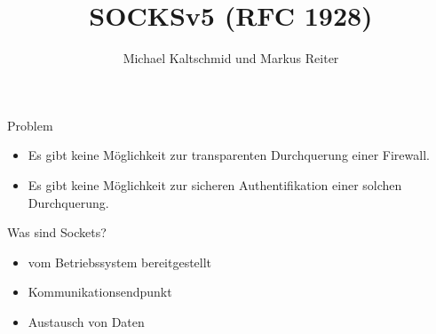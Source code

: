 \documentclass[t]{beamer}
\title{SOCKSv5 (RFC 1928)}
\author{Michael Kaltschmid und Markus Reiter}
\date{\printdate{2017-06-13}}
\begin{document}
  \RaggedRight

  \maketitle

  \begin{frame}{Problem}
    \begin{itemize}
      \item Es gibt keine Möglichkeit zur transparenten Durchquerung einer Firewall.
      \item Es gibt keine Möglichkeit zur sicheren Authentifikation einer solchen Durchquerung.
    \end{itemize}
  \end{frame}

  \begin{frame}{Was sind Sockets?}
    \begin{itemize}
      \item vom Betriebssystem bereitgestellt
      \item Kommunikationsendpunkt
      \item Austausch von Daten
    \end{itemize}
  \end{frame}
\end{document}
